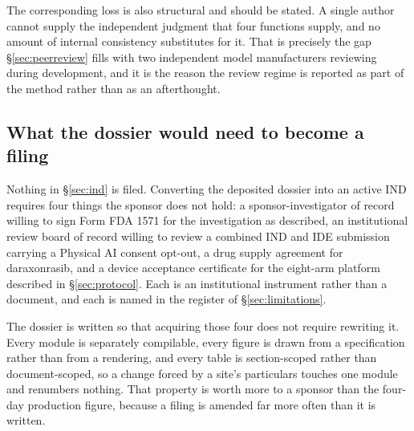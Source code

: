 The corresponding loss is also structural and should be stated. A single author
cannot supply the independent judgment that four functions supply, and no amount
of internal consistency substitutes for it. That is precisely the gap
\S\ref{sec:peerreview} fills with two independent model manufacturers reviewing
during development, and it is the reason the review regime is reported as part
of the method rather than as an afterthought.

\subsection{What the dossier would need to become a filing}

Nothing in \S\ref{sec:ind} is filed. Converting the deposited dossier into an
active IND requires four things the sponsor does not hold: a sponsor-investigator
of record willing to sign Form FDA 1571 for the investigation as described, an
institutional review board of record willing to review a combined IND and IDE
submission carrying a Physical AI consent opt-out, a drug supply agreement for
daraxonrasib, and a device acceptance certificate for the eight-arm platform
described in \S\ref{sec:protocol}. Each is an institutional instrument rather
than a document, and each is named in the register of \S\ref{sec:limitations}.

The dossier is written so that acquiring those four does not require rewriting
it. Every module is separately compilable, every figure is drawn from a
specification rather than from a rendering, and every table is section-scoped
rather than document-scoped, so a change forced by a site's particulars touches
one module and renumbers nothing. That property is worth more to a sponsor than
the four-day production figure, because a filing is amended far more often than
it is written.
